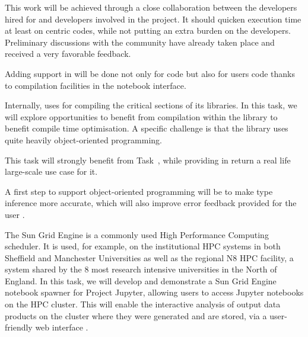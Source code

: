 \begin{workpackage}
\begin{tasklist}
\begin{task}[title=Pythran,id=pythran,lead=LL,partners={UJF},PM=24]
  This work will be achieved through a close collaboration between the \Pythran
  developers hired for \TheProject and \Cython developers involved in the \Sage
  project. It should quicken \Sage execution time at least on \Numpy centric
  codes, while not putting an extra burden on the developers.  Preliminary
  discussions with the \Cython community have already taken place and received a
  very favorable feedback.

  Adding \Pythran support in \Sage will be done not only for \Sage code but also
  for \Sage users code thanks to compilation facilities in the notebook interface.


  Internally, \Sage uses \Cython for compiling the critical sections of
  its libraries. In this task, we will explore opportunities to
  benefit from \Pythran compilation within the \Sage library to benefit
  \Pythran compile time optimisation. A specific challenge is that the \Sage
  library uses quite heavily object-oriented programming.

  This task will strongly benefit from Task~,
  while providing in return a real life large-scale use case for it.

  A first step to support object-oriented programming will be to make
  \Pythran type inference more accurate, which will also improve error
  feedback provided for the user .
\end{task}

\begin{task}[title=Sun Grid Engine Integration in Project Jupyter Hub, lead=USH,id=hpc-jupyter,PM=12]
The Sun Grid Engine is a commonly used High Performance Computing scheduler. It is used, for example, on the institutional HPC systems in both Sheffield and Manchester Universities as well as the regional N8 HPC facility, a system shared by the 8 most research intensive universities in the North of England. In this task, we will develop and demonstrate a Sun Grid Engine notebook spawner for Project Jupyter, allowing users to access Jupyter notebooks on the HPC cluster. This will enable the interactive analysis of output data products on the cluster where they were generated and are stored, via a user-friendly web interface .
\end{task}
\end{tasklist}


\end{workpackage}
